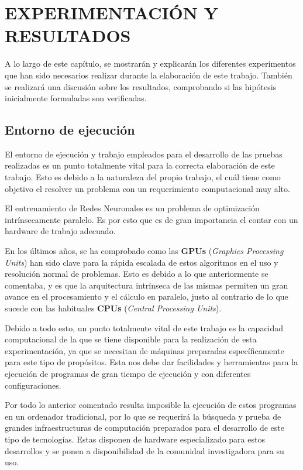 %
\chapter{EXPERIMENTACIÓN Y RESULTADOS}
\label{sec:resultados}

A lo largo de este capítulo, se mostrarán y explicarán los diferentes experimentos que han sido necesarios realizar durante la elaboración de este trabajo. También se realizará una discusión sobre los resultados, comprobando si las hipótesis inicialmente formuladas son verificadas.

\section{Entorno de ejecución}
El entorno de ejecución y trabajo empleados para el desarrollo de las pruebas realizadas es un punto totalmente vital para la correcta elaboración de este trabajo. Esto es debido a la naturaleza del propio trabajo, el cuál tiene como objetivo el resolver un problema con un requerimiento computacional muy alto.

El entrenamiento de Redes Neuronales es un problema de optimización intrínsecamente paralelo. Es por esto que es de gran importancia el contar con un hardware de trabajo adecuado.

En los últimos años, se ha comprobado como las \textbf{GPUs} (\textit{Graphics Processing Units}) han sido clave para la rápida escalada de estos algoritmos en el uso y resolución normal de problemas. Esto es debido a lo que anteriormente se comentaba, y es que la arquitectura intrínseca de las mismas permiten un gran avance en el procesamiento y el cálculo en paralelo, justo al contrario de lo que sucede con las habituales \textbf{CPUs} (\textit{Central Processing Units}).

Debido a todo esto, un punto totalmente vital de este trabajo es la capacidad computacional de la que se tiene disponible para la realización de esta experimentación, ya que se necesitan de máquinas preparadas específicamente para este tipo de propósitos. Esta nos debe dar facilidades y herramientas para la ejecución de programas de gran tiempo de ejecución y con diferentes configuraciones.

Por todo lo anterior comentado resulta imposible la ejecución de estos programas en un ordenador tradicional, por lo que se requerirá la búsqueda y prueba de grandes infraestructuras de computación preparados para el desarrollo de este tipo de tecnologías. Estas disponen de hardware especializado para estos desarrollos y se ponen a disponibilidad de la comunidad investigadora para su uso.

